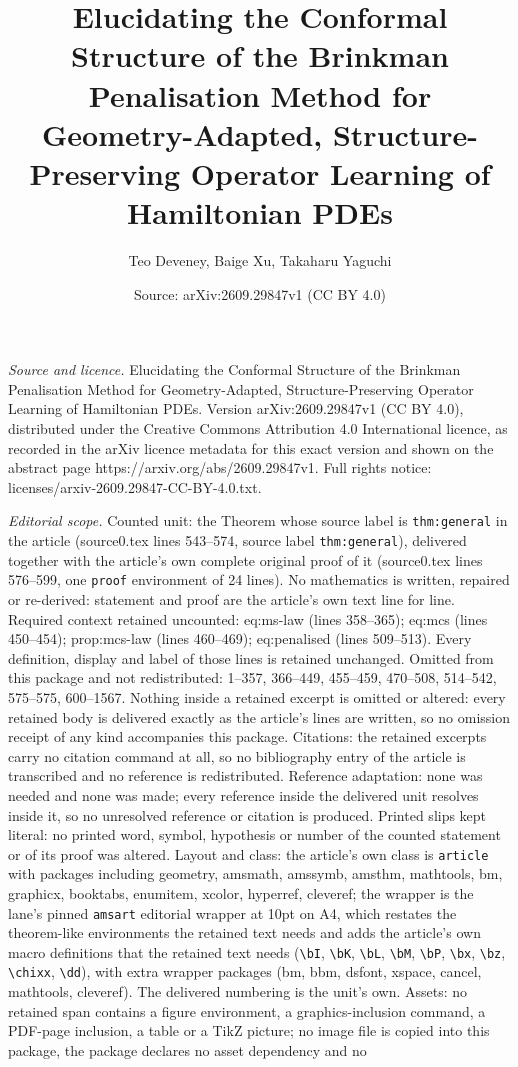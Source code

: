 \documentclass[10pt,a4paper]{amsart}
\title[Elucidating the Conformal Structure of the Brinkman Penalisa]{Elucidating the Conformal Structure of the Brinkman Penalisation Method for Geometry-Adapted, Structure-Preserving Operator Learning of Hamiltonian PDEs}
\author{Teo Deveney, Baige Xu, Takaharu Yaguchi}
\date{Source: arXiv:2609.29847v1 (CC BY 4.0)}
\begin{document}
\maketitle

\noindent\emph{Source and licence.} Elucidating the Conformal Structure of the Brinkman Penalisation Method for Geometry-Adapted, Structure-Preserving Operator Learning of Hamiltonian PDEs. Version arXiv:2609.29847v1 (CC BY 4.0), distributed under the Creative Commons Attribution 4.0 International licence, as recorded in the arXiv licence metadata for this exact version and shown on the abstract page https://arxiv.org/abs/2609.29847v1. Full rights notice: licenses/arxiv-2609.29847-CC-BY-4.0.txt.\par\smallskip

\noindent\textit{Editorial scope.} Counted unit: the Theorem whose source label is \texttt{thm:general} in the article (source0.tex lines 543--574, source label \texttt{thm:general}), delivered together with the article's own complete original proof of it (source0.tex lines 576--599, one \texttt{proof} environment of 24 lines). No mathematics is written, repaired or re-derived: statement and proof are the article's own text line for line. Required context retained uncounted: eq:ms-law (lines 358--365); eq:mcs (lines 450--454); prop:mcs-law (lines 460--469); eq:penalised (lines 509--513). Every definition, display and label of those lines is retained unchanged. Omitted from this package and not redistributed: 1--357, 366--449, 455--459, 470--508, 514--542, 575--575, 600--1567. Nothing inside a retained excerpt is omitted or altered: every retained body is delivered exactly as the article's lines are written, so no omission receipt of any kind accompanies this package. Citations: the retained excerpts carry no citation command at all, so no bibliography entry of the article is transcribed and no reference is redistributed. Reference adaptation: none was needed and none was made; every reference inside the delivered unit resolves inside it, so no unresolved reference or citation is produced. Printed slips kept literal: no printed word, symbol, hypothesis or number of the counted statement or of its proof was altered. Layout and class: the article's own class is \texttt{article} with packages including geometry, amsmath, amssymb, amsthm, mathtools, bm, graphicx, booktabs, enumitem, xcolor, hyperref, cleveref; the wrapper is the lane's pinned \texttt{amsart} editorial wrapper at 10pt on A4, which restates the theorem-like environments the retained text needs and adds the article's own macro definitions that the retained text needs (\texttt{\textbackslash bI}, \texttt{\textbackslash bK}, \texttt{\textbackslash bL}, \texttt{\textbackslash bM}, \texttt{\textbackslash bP}, \texttt{\textbackslash bx}, \texttt{\textbackslash bz}, \texttt{\textbackslash chixx}, \texttt{\textbackslash dd}), with extra wrapper packages (bm, bbm, dsfont, xspace, cancel, mathtools, cleveref). The delivered numbering is the unit's own. Assets: no retained span contains a figure environment, a graphics-inclusion command, a PDF-page inclusion, a table or a TikZ picture; no image file is copied into this package, the package declares no asset dependency and no 
\end{document}

